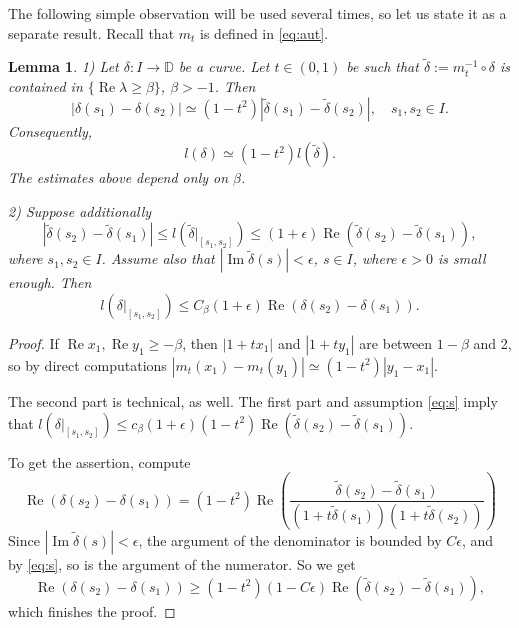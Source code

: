 \documentclass[a4paper,12pt]{amsart}
\newcommand\DD{{\mathbb D}}
\def\im{\operatorname{Im}}
\def\re{\operatorname{Re}}
\newtheorem{lemma}[theorem]{Lemma}
\theoremstyle{remark}\newtheorem{remark}[theorem]{Remark}
\begin{document}
The following simple observation will be used several times, so let us state it as a separate result.
Recall that $m_t$ is defined in \eqref{eq:aut}.

\begin{lemma}\label{lem:mt} 1) Let $\delta:I\to \DD$ be a curve. Let $t\in (0,1)$  be such that $\tilde \delta:=m_t^{-1}\circ \delta $ is contained in $\{\re \lambda \geq \beta\}$, $\beta>-1$. Then 
$$| \delta(s_1) - \delta(s_2)|\simeq (1-t^2) |\tilde \delta (s_1) - \tilde \delta(s_2)|,\quad s_1,s_2\in I.$$ 
Consequently, 
$$l(\delta)\simeq (1-t^2) l(\tilde \delta).$$ 
The estimates above depend only on $\beta$.

2) Suppose additionally
\begin{equation}\label{eq:s}
\left| \tilde\delta(s_2) - \tilde\delta(s_1)\right| \le 
l(\tilde \delta |_{[s_1,s_2]} )\leq (1+ \epsilon) \re(\tilde\delta(s_2) - \tilde\delta(s_1)),
\end{equation} 
where $s_1, s_2\in I$.
Assume also that $|\im \tilde \delta(s)|<\epsilon$, $s\in I$,  where $\epsilon>0$ is small enough. Then $$l(\delta|_{[s_1,s_2]}) \leq  C_{\beta} (1+ \epsilon) \re (\delta(s_2) - \delta(s_1)).$$ 
\end{lemma}

\begin{proof}
If $\re x_1, \re y_1\geq -\beta$, then $|1+t x_1|$ and $|1+t y_1|$ are between $1-\beta$ and 2, so by direct computations $|m_t(x_1) -m_t(y_1)|\simeq  (1-t^2)|y_1-x_1|$.

The second part is technical, as well. The first part
and assumption \eqref{eq:s} imply that $l(\delta|_{[s_1, s_2]}) \leq c_\beta (1+\epsilon) (1-t^2) \re (\tilde\delta (s_2) - \tilde \delta (s_1)).$

To get the assertion, compute
\[ 
\re (\delta(s_2) - \delta(s_1)) = (1-t^2) 
\re \left(     
\frac{\tilde\delta(s_2) - \tilde\delta(s_1)}{(1+t\tilde\delta(s_1)) (1+t\tilde\delta(s_2))} \right)
\]
Since $|\im \tilde \delta(s)|<\epsilon$, the argument of the 
denominator is bounded by $C\epsilon$, and by \eqref{eq:s}, so is
the argument of the numerator. So we get
\[
\re (\delta(s_2) - \delta(s_1)) \geq
(1-t^2)(1-C\epsilon)\re \left( \tilde\delta(s_2) - \tilde\delta(s_1)\right),
\]
which finishes the proof.
\end{proof}
\end{document}
